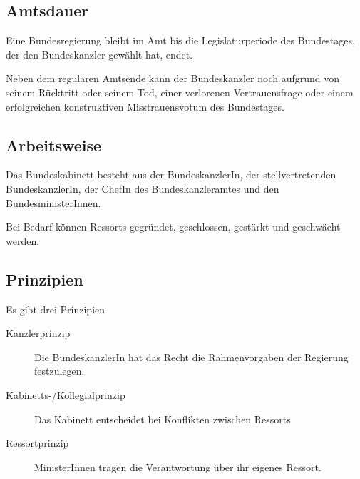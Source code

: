 \documentclass{article}
\begin{document}
\subsection{Amtsdauer}
Eine Bundesregierung bleibt im Amt bis die Legislaturperiode des Bundestages, der den Bundeskanzler gewählt hat, endet.

Neben dem regulären Amtsende kann der Bundeskanzler noch aufgrund von seinem Rücktritt oder seinem Tod, einer verlorenen Vertrauensfrage oder einem erfolgreichen konstruktiven Misstrauensvotum des Bundestages.

\subsection{Arbeitsweise}
Das Bundeskabinett besteht aus der BundeskanzlerIn, der stellvertretenden BundeskanzlerIn, der ChefIn des Bundeskanzleramtes und den BundesministerInnen.

Bei Bedarf können Ressorts gegründet, geschlossen, gestärkt und geschwächt werden.

\subsection{Prinzipien}
Es gibt drei Prinzipien
\begin{description}
 \item[Kanzlerprinzip] Die BundeskanzlerIn hat das Recht die Rahmenvorgaben der Regierung festzulegen.
 \item[Kabinetts-/Kollegialprinzip] Das Kabinett entscheidet bei Konflikten zwischen Ressorts
 \item[Ressortprinzip] MinisterInnen tragen die Verantwortung über ihr eigenes Ressort.
\end{description}
\end{document}
